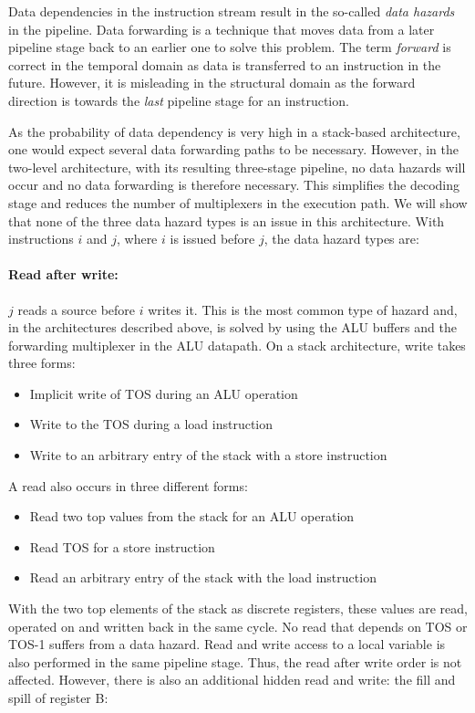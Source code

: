 Data dependencies in the instruction stream result in the so-called
\emph{data hazards} \cite{Hennessy06} in the pipeline. Data
forwarding is a technique that moves data from a later pipeline stage
back to an earlier one to solve this problem. The term \emph{forward}
is correct in the temporal domain as data is transferred to an
instruction in the future. However, it is misleading in the
structural domain as the forward direction is towards the \emph{last}
pipeline stage for an instruction.

As the probability of data dependency is very high in a stack-based
architecture, one would expect several data forwarding paths to be
necessary. However, in the two-level architecture, with its resulting
three-stage pipeline, no data hazards will occur and no data
forwarding is therefore necessary. This simplifies the decoding stage
and reduces the number of multiplexers in the execution path. We will
show that none of the three data hazard types \cite{Hennessy06} is an
issue in this architecture. With instructions $i$ and $j$, where $i$
is issued before $j$, the data hazard types are:

\paragraph{Read after write:} $j$ reads a source before $i$ writes it. This
is the most common type of hazard and, in the architectures
described above, is solved by using the ALU buffers and the
forwarding multiplexer in the ALU datapath. On a stack architecture,
write takes three forms:
%
\begin{itemize}
    \item Implicit write of TOS during an ALU operation
    \item Write to the TOS during a load instruction
    \item Write to an arbitrary entry of the stack with a store instruction
\end{itemize}
%
A read also occurs in three different forms:
\begin{itemize}
    \item Read two top values from the stack for an ALU operation
    \item Read TOS for a store instruction
    \item Read an arbitrary entry of the stack with the load instruction
\end{itemize}
%
With the two top elements of the stack as discrete registers, these
values are read, operated on and written back in the same cycle. No
read that depends on TOS or TOS-1 suffers from a data hazard. Read
and write access to a local variable is also performed in the same
pipeline stage. Thus, the read after write order is not affected.
However, there is also an additional hidden read and write: the fill
and spill of register B:



